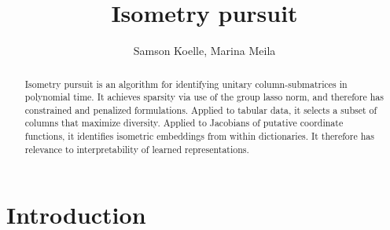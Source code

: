 \documentclass[a4paper,11pt]{article}
\begin{document}
\title{Isometry pursuit}
\author{Samson Koelle, Marina Meila}

\maketitle

\begin{abstract}

Isometry pursuit is an algorithm for identifying unitary column-submatrices in polynomial time.
It achieves sparsity via use of the group lasso norm, and therefore has constrained and penalized formulations.
Applied to tabular data, it selects a subset of columns that maximize diversity.
Applied to Jacobians of putative coordinate functions, it identifies isometric embeddings from within dictionaries.
It therefore has relevance to interpretability of learned representations.


\end{abstract}

\section{Introduction}

\end{document}
